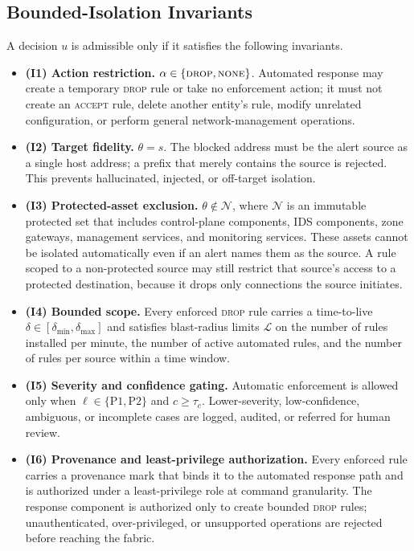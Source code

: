 \documentclass[final,5p]{elsarticle}
\begin{document}
\subsection{Bounded-Isolation Invariants}
\label{sec:invariants}

A decision $u$ is admissible only if it satisfies the following invariants.

\begin{itemize}
    \item \textbf{(I1) Action restriction.} $\alpha \in \{\textsc{drop},\textsc{none}\}$. Automated response may create a temporary \textsc{drop} rule or take no enforcement action; it must not create an \textsc{accept} rule, delete another entity's rule, modify unrelated configuration, or perform general network-management operations.

    \item \textbf{(I2) Target fidelity.} $\theta=s$. The blocked address must be the alert source as a single host address; a prefix that merely contains the source is rejected. This prevents hallucinated, injected, or off-target isolation.

    \item \textbf{(I3) Protected-asset exclusion.} $\theta \notin \mathcal{N}$, where $\mathcal{N}$ is an immutable protected set that includes control-plane components, IDS components, zone gateways, management services, and monitoring services. These assets cannot be isolated automatically even if an alert names them as the source. A rule scoped to a non-protected source may still restrict that source's access to a protected destination, because it drops only connections the source initiates.

    \item \textbf{(I4) Bounded scope.} Every enforced \textsc{drop} rule carries a time-to-live $\delta \in [\delta_{\min},\delta_{\max}]$ and satisfies blast-radius limits $\mathcal{L}$ on the number of rules installed per minute, the number of active automated rules, and the number of rules per source within a time window.

    \item \textbf{(I5) Severity and confidence gating.} Automatic enforcement is allowed only when $\ell \in \{\text{P1},\text{P2}\}$ and $c\geq\tau_c$. Lower-severity, low-confidence, ambiguous, or incomplete cases are logged, audited, or referred for human review.

    \item \textbf{(I6) Provenance and least-privilege authorization.} Every enforced rule carries a provenance mark that binds it to the automated response path and is authorized under a least-privilege role at command granularity. The response component is authorized only to create bounded \textsc{drop} rules; unauthenticated, over-privileged, or unsupported operations are rejected before reaching the fabric.
\end{itemize}
\end{document}
